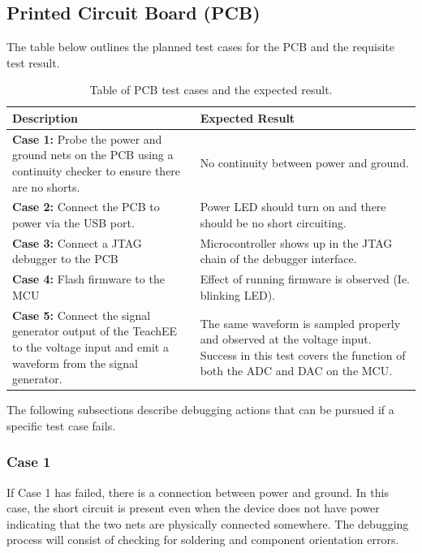 \documentclass[letterpaper,12pt]{article}
\begin{document}
\subsection{Printed Circuit Board (PCB)} %
The table below outlines the planned test cases for the PCB and the requisite
test result.

\begin{table}[h!]
    \centering
    \caption{Table of PCB test cases and the expected result.}
    \begin{tabularx}{\textwidth}{X|X}
        Description & Expected Result \\ 
        \hline
        \textbf{Case 1:} Probe the power and ground nets on the PCB using a
        continuity checker to ensure there are no shorts. & No continuity
        between power and ground. \\
        \hline
        \textbf{Case 2:} Connect the PCB to power via the USB port. & Power LED
        should turn on and there should be no short circuiting.\\
        \hline
        \textbf{Case 3:} Connect a JTAG debugger to the PCB & Microcontroller
        shows up in the JTAG chain of the debugger interface. \\
        \hline
        \textbf{Case 4:} Flash firmware to the MCU & Effect of running firmware is observed (Ie.
        blinking LED). \\
        \hline
        \textbf{Case 5:} Connect the signal generator output of the TeachEE to
        the voltage input and emit a waveform from the signal generator. & The
        same waveform is sampled properly and observed at the voltage input.
        Success in this test covers the function of both the ADC and DAC on the
        MCU.\\
    \end{tabularx}
\end{table}
\FloatBarrier

\noindent
The following subsections describe debugging actions that can be pursued if a
specific test case fails.

\subsubsection{Case 1}
If Case 1 has failed, there is a connection between power and ground. In this
case, the short circuit is present even when the device does not have power
indicating that the two nets are physically connected somewhere. The debugging
process will consist of checking for soldering and component orientation errors.
\end{document}
